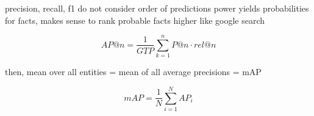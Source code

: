 precision, recall, f1 do not consider order of predictions
power yields probabilities for facts, makes sense to rank probable facts higher
like google search

\[
    AP@n = \frac{1}{GTP} \sum_{k=1}^{n} P@n \cdot rel@n
\]

then, mean over all entities = mean of all average precisions = mAP

\[
    mAP = \frac{1}{N} \sum_{i=1}^{N} AP_i
\]
